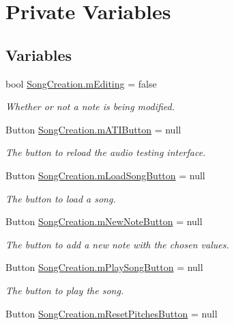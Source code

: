\hypertarget{group___s_c_priv_var}{}\section{Private Variables}
\label{group___s_c_priv_var}
\subsection*{Variables}
\begin{DoxyCompactItemize}
\item 
bool \hyperlink{group___s_c_priv_var_ga5aec1c6ae4159b96ce466ee6b1da3371}{Song\+Creation.\+m\+Editing} = false
\begin{DoxyCompactList}\small\item\em Whether or not a note is being modified. \end{DoxyCompactList}\item 
Button \hyperlink{group___s_c_priv_var_gacc018689b7f6508762958c3796a68937}{Song\+Creation.\+m\+A\+T\+I\+Button} = null
\begin{DoxyCompactList}\small\item\em The button to reload the audio testing interface. \end{DoxyCompactList}\item 
Button \hyperlink{group___s_c_priv_var_ga0e016451dff405f570bf530586fb36fa}{Song\+Creation.\+m\+Load\+Song\+Button} = null
\begin{DoxyCompactList}\small\item\em The button to load a song. \end{DoxyCompactList}\item 
Button \hyperlink{group___s_c_priv_var_ga488ce0727c77abe7c84989241f4e55b4}{Song\+Creation.\+m\+New\+Note\+Button} = null
\begin{DoxyCompactList}\small\item\em The button to add a new note with the chosen values. \end{DoxyCompactList}\item 
Button \hyperlink{group___s_c_priv_var_ga8afebf9e2e92619f9ef9cfe5410a143a}{Song\+Creation.\+m\+Play\+Song\+Button} = null
\begin{DoxyCompactList}\small\item\em The button to play the song. \end{DoxyCompactList}\item 
Button \hyperlink{group___s_c_priv_var_ga89e82b9c8af6b34d7e0ec37c81f2f674}{Song\+Creation.\+m\+Reset\+Pitches\+Button} = null

\end{DoxyCompactItemize}
